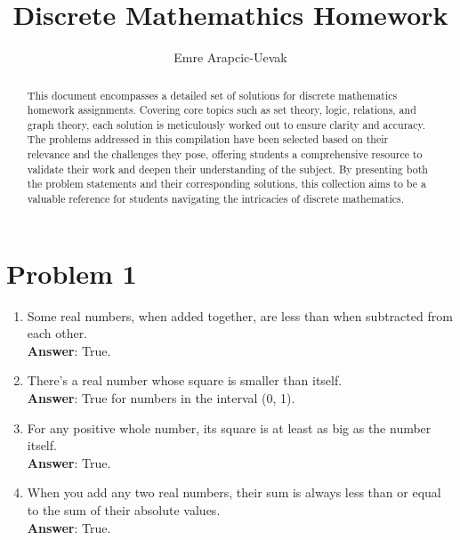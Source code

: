 \documentclass[a4paper, 10pt]{article}
\title{Discrete Mathemathics Homework}
\author{Emre Arapcic-Uevak}
\date{}
\begin{document}
	\maketitle
	\vspace{5mm}
	
	\begin{abstract}
		\begin{center}
			\noindent This document encompasses a detailed set of solutions for discrete mathematics homework assignments. Covering core topics such as set theory, logic, relations, and graph theory, each solution is meticulously worked out to ensure clarity and accuracy. The problems addressed in this compilation have been selected based on their relevance and the challenges they pose, offering students a comprehensive resource to validate their work and deepen their understanding of the subject. By presenting both the problem statements and their corresponding solutions, this collection aims to be a valuable reference for students navigating the intricacies of discrete mathematics.
		\end{center}
	\end{abstract}
	\pagebreak
	
	\tableofcontents
	\pagebreak

    \section{Problem 1}

    \begin{enumerate}
        \item Some real numbers, when added together, are less than when subtracted from each other. \\
        \textbf{Answer}: True.

        \item There's a real number whose square is smaller than itself. \\
        \textbf{Answer}: True for numbers in the interval (0, 1).

        \item For any positive whole number, its square is at least as big as the number itself. \\
        \textbf{Answer}: True.

        \item When you add any two real numbers, their sum is always less than or equal to the sum of their absolute values. \\
        \textbf{Answer}: True.
    \end{enumerate}
\end{document}
